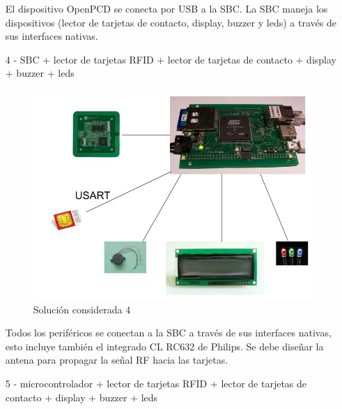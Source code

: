 \begin{itemize}
El dispositivo OpenPCD se conecta por USB a la SBC. La SBC maneja los dispositivos (lector de tarjetas de contacto, display, buzzer y leds) a través de sus interfaces nativas.

\bigskip
\bigskip
\item[4 -] SBC + lector de tarjetas RFID + lector de tarjetas de contacto + display + buzzer + leds
\bigskip

\begin{figure}[H]
\centering
  \begin{center}
  \includegraphics[scale=.25]{Imagenes/3.jpg} 
  \end{center}
  \caption{Solución considerada 4}\label{Fig:HW4} 
\end{figure}

Todos los periféricos se conectan a la SBC a través de sus interfaces nativas, esto incluye también el integrado CL RC632 \cite{RC632} de Philips. Se debe diseñar la antena para propagar la señal RF hacia las tarjetas.

\bigskip
\bigskip
\item[5 -] microcontrolador + lector de tarjetas RFID + lector de tarjetas de contacto + display + buzzer + leds
\bigskip


\end{itemize}
